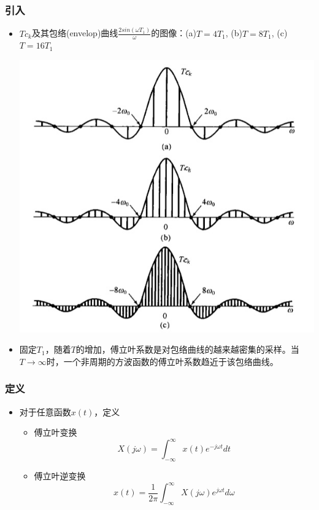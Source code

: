 \documentclass[CJKutf8,dvipsnames,table]{beamer}
\begin{document}
\begin{CJK*}{UTF8}{song}
  \begin{frame}
    \frametitle{引入}
    \begin{itemize}
    \item $Tc_k$及其包络(envelop)曲线$\frac{2sin(\omega T_1)}{\omega}$的图像：(a)$T=4T_1$, (b)$T=8T_1$, (c)$T=16T_1$
		    \begin{center}
		   	\includegraphics[scale=.27]{ss-c-f4-2}
    		\end{center}
	\item 固定$T_1$，随着$T$的增加，傅立叶系数是对包络曲线的越来越密集的采样。当$T \to \infty$时，一个非周期的方波函数的傅立叶系数趋近于该包络曲线。
    \end{itemize}

  \end{frame}    
   
  \begin{frame}
    \frametitle{定义}
    \begin{itemize}
    \item 对于任意函数$x(t)$，定义
    \begin{itemize}
    	\item 傅立叶变换
    	\[
			X(j\omega) = \int_{-\infty}^{\infty}x(t)e^{-j\omega t}dt    
    	\]
    	\item 傅立叶逆变换
    	\[
			x(t) = \frac{1}{2\pi}\int_{-\infty}^{\infty}X(j\omega)e^{j\omega t}d\omega    
    	\]    
    	\end{itemize}
    \end{itemize}


\end{frame}
\end{CJK*}
\end{document}
